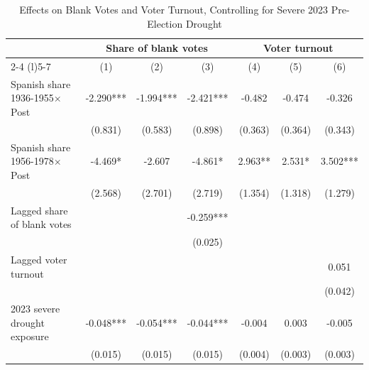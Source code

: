 \begin{table}[!h]
\caption{Effects on Blank Votes and Voter Turnout, Controlling for Severe 2023 Pre-Election Drought}
\renewcommand{\arraystretch}{1.25}
\setlength{\tabcolsep}{6pt}
\centering
\begin{tabular}[t]{lcccccc}
\hline
 & \multicolumn{3}{c}{Share of blank votes} & \multicolumn{3}{c}{Voter turnout} \\
\cmidrule(l){2-4} \cmidrule(l){5-7}
  & (1) & (2) & (3) & (4) & (5) & (6)\\
\hline
Spanish share 1936-1955$\times$Post & -2.290*** & -1.994*** & -2.421*** & -0.482 & -0.474 & -0.326\\
 & (0.831) & (0.583) & (0.898) & (0.363) & (0.364) & (0.343)\\
Spanish share 1956-1978$\times$Post & -4.469* & -2.607 & -4.861* & 2.963** & 2.531* & 3.502***\\
 & (2.568) & (2.701) & (2.719) & (1.354) & (1.318) & (1.279)\\
Lagged share of blank votes &  &  & -0.259*** &  &  & \\
 &  &  & (0.025) &  &  & \\
Lagged voter turnout &  &  &  &  &  & 0.051\\
 &  &  &  &  &  & (0.042)\\
2023 severe drought exposure & -0.048*** & -0.054*** & -0.044*** & -0.004 & 0.003 & -0.005\\
 & (0.015) & (0.015) & (0.015) & (0.004) & (0.003) & (0.003)\\


\end{tabular}
\end{table}
